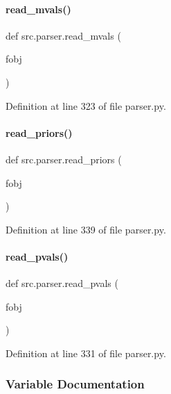 \paragraph{\texorpdfstring{read\+\_\+mvals()}{read\_mvals()}}
{\footnotesize\ttfamily def src.\+parser.\+read\+\_\+mvals (\begin{DoxyParamCaption}\item[{}]{fobj }\end{DoxyParamCaption})}



Definition at line 323 of file parser.\+py.

\mbox{\label{namespacesrc_1_1parser_a495dddc31f547cfe3d66134ffeb1bd90}} 
\paragraph{\texorpdfstring{read\+\_\+priors()}{read\_priors()}}
{\footnotesize\ttfamily def src.\+parser.\+read\+\_\+priors (\begin{DoxyParamCaption}\item[{}]{fobj }\end{DoxyParamCaption})}



Definition at line 339 of file parser.\+py.

\mbox{\label{namespacesrc_1_1parser_a93628f20ba0ae19f3efa460ea7f3e730}} 
\paragraph{\texorpdfstring{read\+\_\+pvals()}{read\_pvals()}}
{\footnotesize\ttfamily def src.\+parser.\+read\+\_\+pvals (\begin{DoxyParamCaption}\item[{}]{fobj }\end{DoxyParamCaption})}



Definition at line 331 of file parser.\+py.



\subsubsection{Variable Documentation}
\mbox{\label{namespacesrc_1_1parser_a26b1b3d3368acc2ec0ec971560d78275}} 
